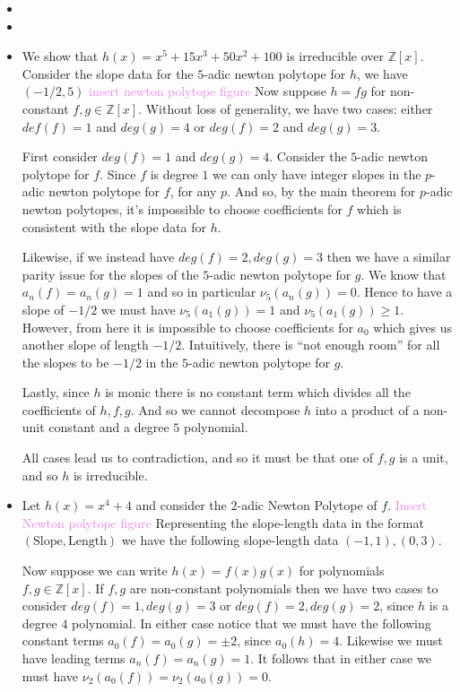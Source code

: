 \documentclass[12pt,letterpaper,boxed]{hmcpset}
\newcommand{\wg}[1]{\textcolor{violet}{#1}}
\newcommand{\Z}{\mathbb Z}
\begin{document}
\begin{solution}
\begin{itemize}
\item 
\item
\item We show that $h(x) = x^5 + 15x^3 + 50x^2 + 100$ is irreducible
over $\Z[x]$. Consider the slope data for the $5$-adic newton polytope
for $h$, we have $(-1/2, 5)$
\wg{insert newton polytope figure}
Now suppose $h = fg$ for non-constant $f,g \in \Z[x]$.
Without loss of generality, we have two cases: either $def(f) = 1$ and $deg(g) = 4$ or $deg(f) =
2$ and $deg(g) = 3$.

First consider $deg(f) = 1$ and $deg(g) = 4$. Consider the $5$-adic
newton polytope for $f$. Since $f$ is degree $1$ we can only have
integer slopes in the $p$-adic newton polytope for $f$, for any $p$. 
And so, by the main theorem for $p$-adic newton polytopes, it's
impossible to choose coefficients for $f$ which is consistent with the
slope data for $h$.

Likewise, if we instead have $deg(f) = 2, deg(g) = 3$ then we have a
similar parity issue for the slopes of the $5$-adic newton polytope
for $g$. We know that $a_n(f) = a_n(g) = 1$ and so in particular
$\nu_5(a_n(g)) = 0$. Hence to have a slope of $-1/2$ we must have
$\nu_5(a_1(g)) = 1$ and $\nu_5(a_1(g)) \geq 1$. However, from here it
is impossible to choose coefficients for $a_0$ which gives us another
slope of length $-1/2$. Intuitively, there is ``not enough room''
for all the slopes to be $-1/2$ in the $5$-adic newton polytope for
$g$.

Lastly, since $h$ is monic there is no constant term which divides all
the coefficients of $h,f,g$. And so we cannot decompose $h$ into a
product of a non-unit constant and a degree $5$ polynomial.

All cases lead us to contradiction, and so it must be that one of
$f,g$ is a unit, and so $h$ is irreducible. 


\item Let $h(x) = x^4 + 4$ and consider the $2$-adic Newton Polytope
of $f$. 
\wg{Insert Newton polytope figure}
Representing the slope-length data in the format $(\text{Slope},
\text{Length})$ we have the following slope-length data $(-1, 1),
(0,3)$. 

Now suppose we can write $h(x) = f(x)g(x)$ for polynomials $f,g \in
\Z[x]$. If $f,g$ are non-constant polynomials then we have two cases
to consider $deg(f) = 1, deg(g) = 3$ or $deg(f) = 2, deg(g) = 2$,
since $h$ is a degree $4$ polynomial. In either case notice that we
must have the following constant terms $a_0(f) = a_0(g) = \pm 2$,
since $a_0(h) = 4$. Likewise we must have leading terms $a_n(f) =
a_n(g) = 1$. It follows that in either case we must have $\nu_2(a_0(f)) =
\nu_2(a_0(g)) = 0$. 


\end{itemize}
\end{solution}
\end{document}
